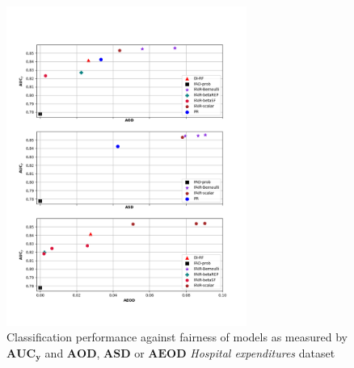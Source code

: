 \documentclass[preprint,12pt]{elsarticle}
\begin{document}
\begin{figure}
	\center
	\includegraphics[angle=0, width=0.7\textwidth]{MEPS19.png}
	\captionsetup{justification=centering}
	\caption{Classification performance against fairness of models as measured by $\mathbf{AUC_y}$ and $\mathbf{AOD}$, $\mathbf{ASD}$ or $\mathbf{AEOD}$ \textit{Hospital expenditures} dataset}
	\label{fig:MEPS19}
	\vskip -0.2in
\end{figure}
\end{document}
